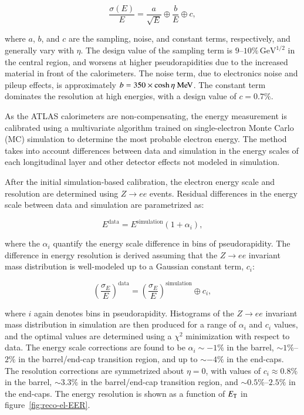 \begin{equation}
	\frac{\sigma(E)}{E} = \frac{a}{\sqrt{E}} \oplus \frac{b}{E} \oplus c,
\end{equation}

where $a$, $b$, and $c$ are the sampling, noise, and constant terms, respectively, and generally vary with $\eta$. The design value of the sampling term is $9\mbox{--}10\%\,\mbox{GeV}^{1/2}$ in the central region, and worsens at higher pseudorapidities due to the increased material in front of the calorimeters. The noise term, due to electronics noise and pileup effects, is approximately $b = 350 \times \cosh\eta \MeV$. The constant term dominates the resolution at high energies, with a design value of $c=0.7\%$. 

As the ATLAS calorimeters are non-compensating, the energy measurement is calibrated using a multivariate algorithm trained on single-electron Monte Carlo (MC) simulation to determine the most probable electron energy. The method takes into account differences between data and simulation in the energy scales of each longitudinal layer and other detector effects not modeled in simulation. 

After the initial simulation-based calibration, the electron energy scale and resolution are determined using $Z\rightarrow ee$ events. Residual differences in the energy scale between data and simulation are parametrized as:

\begin{equation}
	E^{\mathrm{data}} = E^{\mathrm{simulation}} (1 + \alpha_i),
\end{equation}

where the $\alpha_i$ quantify the energy scale difference in bins of pseudorapidity. The difference in energy resolution is derived assuming that the $Z\rightarrow ee$ invariant mass distribution is well-modeled up to a Gaussian constant term, $c_i$: 

\begin{equation}
	\left(\frac{\sigma_E}{E}\right)^{\mathrm{data}} = \left(\frac{\sigma_E}{E}\right)^{\mathrm{simulation}} \oplus c_i,
\end{equation}

where $i$ again denotes bins in pseudorapidity. Histograms of the $Z\rightarrow ee$ invariant mass distribution in simulation are then produced for a range of $\alpha_i$ and $c_i$ values, and the optimal values are determined using a $\chi^2$ minimization with respect to data. The energy scale corrections are found to be $\alpha_i\sim -1\%$ in the barrel, $\sim1\%$--$2\%$ in the barrel/end-cap transition region, and up to $\sim-4\%$ in the end-caps. The resolution corrections are symmetrized about $\eta=0$, with values of $c_i\approx 0.8\%$ in the barrel, $\sim3.3\%$ in the barrel/end-cap transition region, and $\sim0.5\%$--$2.5\%$ in the end-caps. The energy resolution is shown as a function of $E_{\text{T}}$ in figure~\ref{fig:reco-el-EER}.

